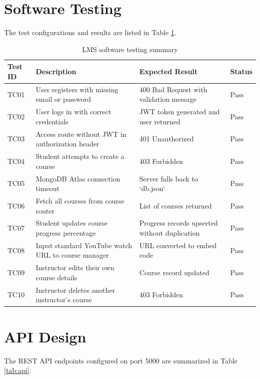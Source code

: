 \documentclass[12pt,a4paper]{report}
\begin{document}
\section{Software Testing}
The test configurations and results are listed in Table \ref{tab:testcases}.

\begin{table}[h!]
\centering
\begin{tabular}{|p{1.5cm}|p{6.5cm}|p{3.5cm}|p{1.5cm}|}
\hline
\textbf{Test ID} & \textbf{Description} & \textbf{Expected Result} & \textbf{Status} \\
\hline
TC01 & User registers with missing email or password & 400 Bad Request with validation message & Pass \\
\hline
TC02 & User logs in with correct credentials & JWT token generated and user returned & Pass \\
\hline
TC03 & Access route without JWT in authorization header & 401 Unauthorized & Pass \\
\hline
TC04 & Student attempts to create a course & 403 Forbidden & Pass \\
\hline
TC05 & MongoDB Atlas connection timeout & Server falls back to `db.json` & Pass \\
\hline
TC06 & Fetch all courses from course router & List of courses returned & Pass \\
\hline
TC07 & Student updates course progress percentage & Progress records upserted without duplication & Pass \\
\hline
TC08 & Input standard YouTube watch URL to course manager & URL converted to embed code & Pass \\
\hline
TC09 & Instructor edits their own course details & Course record updated & Pass \\
\hline
TC10 & Instructor deletes another instructor's course & 403 Forbidden & Pass \\
\hline
\end{tabular}
\caption{LMS software testing summary}
\label{tab:testcases}
\end{table}

\clearpage

\section{API Design}
The REST API endpoints configured on port 5000 are summarized in Table \ref{tab:api}.
\end{document}
